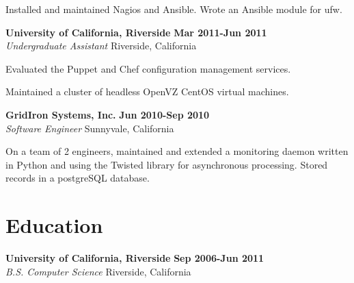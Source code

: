 \begin{lonelist}
\begin{innerlist}
  \item Installed and maintained Nagios and Ansible. Wrote an Ansible module
      for ufw.
  \end{innerlist}

\item[] \textbf{University of California, Riverside} \hfill \textbf{Mar 2011-Jun 2011}\\
  \textit{Undergraduate Assistant} \hfill Riverside, California
  \begin{innerlist}
  \item Evaluated the Puppet and Chef configuration management services.

  \item Maintained a cluster of headless OpenVZ CentOS virtual machines.
  \end{innerlist}

\item[] \textbf{GridIron Systems, Inc.} \hfill \textbf{Jun 2010-Sep 2010}\\
  \textit{Software Engineer} \hfill Sunnyvale, California
  \begin{innerlist}
  \item On a team of 2 engineers, maintained and extended a monitoring daemon
      written in Python and using the Twisted library for asynchronous
      processing. Stored records in a postgreSQL database.
  \end{innerlist}

\end{lonelist}


\section{Education}
\textbf{University of California, Riverside} \hfill \textbf{Sep 2006-Jun 2011}\\
  \textit{B.S. Computer Science} \hfill Riverside, California
